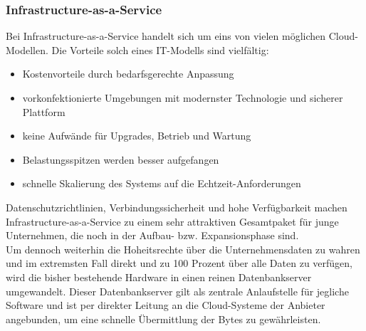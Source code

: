 \subsubsection{Infrastructure-as-a-Service}
Bei Infrastructure-as-a-Service handelt sich um eins von vielen möglichen
Cloud-Modellen. Die Vorteile solch eines IT-Modells sind vielfältig: 
\begin{itemize}
  \item Kostenvorteile durch bedarfsgerechte Anpassung
  \item vorkonfektionierte Umgebungen mit modernster Technologie und sicherer
  Plattform
  \item keine Aufwände für Upgrades, Betrieb und Wartung
  \item Belastungsspitzen werden besser aufgefangen
  \item schnelle Skalierung des Systems auf die Echtzeit-Anforderungen
\end{itemize}
Datenschutzrichtlinien, Verbindungssicherheit und hohe Verfügbarkeit machen
Infrastructure-as-a-Service zu einem sehr attraktiven Gesamtpaket für junge
Unternehmen, die noch in der Aufbau- bzw. Expansionsphase sind. \\
Um dennoch weiterhin die Hoheitsrechte über die Unternehmensdaten zu wahren und
im extremsten Fall direkt und zu 100 Prozent über alle Daten zu verfügen, wird
die bisher bestehende Hardware in einen reinen Datenbankserver umgewandelt. Dieser
Datenbankserver gilt als zentrale Anlaufstelle für jegliche Software und ist per
direkter Leitung an die Cloud-Systeme der Anbieter angebunden, um eine schnelle
Übermittlung der Bytes zu gewährleisten.
